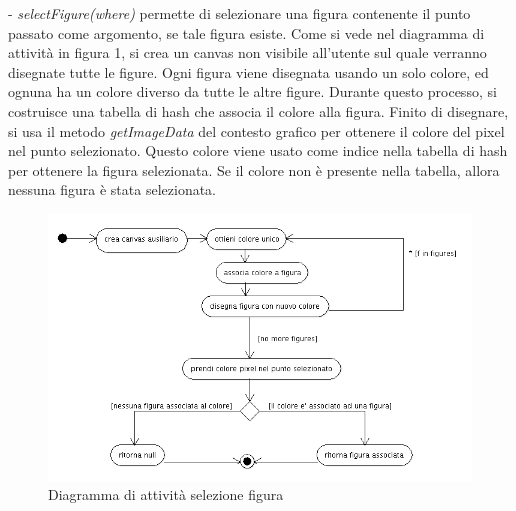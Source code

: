 \begin{elencopuntato}[\subsubsecindent]
\item[-]  \textit{selectFigure(where)} permette di selezionare una figura contenente il punto passato come argomento, se tale figura esiste. Come si vede nel diagramma di attivit\`a in figura 1, si crea un canvas non visibile all'utente sul quale verranno disegnate tutte le figure. Ogni figura viene disegnata usando un solo colore, ed ognuna ha un colore diverso da tutte le altre figure. Durante questo processo, si costruisce una tabella di hash che associa il colore alla figura. Finito di disegnare, si usa il metodo \textit{getImageData} del contesto grafico per ottenere il colore del pixel nel punto selezionato. Questo colore viene usato come indice nella tabella di hash per ottenere la figura selezionata. Se il colore non \`e presente nella tabella, allora nessuna figura \`e stata selezionata.

\begin{figure}[!ht]
\centering
\includegraphics[scale=0.5]{defaultselection.png}
\caption{Diagramma di attivit\`a selezione figura}
\end{figure}


\end{elencopuntato}
